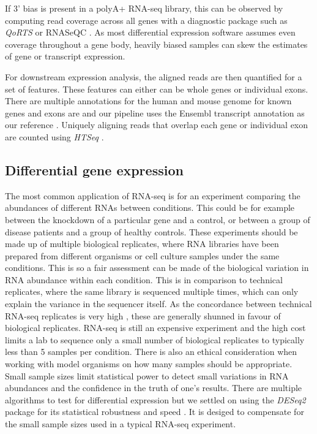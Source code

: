 If 3' bias is present in a polyA+ RNA-seq library, this can be observed by computing read coverage across all genes with a diagnostic package such as \textit{QoRTS} or RNASeQC \citep{Hartley2015a, Deluca2012}. 
As most differential expression software assumes even coverage throughout a gene body, heavily biased samples can skew the estimates of gene or transcript expression.

For downstream expression analysis, the aligned reads are then quantified for a set of features. These features can either can be whole genes or individual exons. 
There are multiple annotations for the human and mouse genome for known genes and exons are and our pipeline uses the Ensembl transcript annotation as our reference \citep{Cunningham2015}. 
Uniquely aligning reads that overlap each gene or individual exon are counted using \textit{HTSeq} \citep{Anders2015-wz}.

\subsection{Differential gene expression}

The most common application of RNA-seq is for an experiment comparing the abundances of different RNAs between conditions.
This could be for example between the knockdown of a particular gene and a control, or between a group of disease patients and a group of healthy controls. 
These experiments should be made up of multiple biological replicates, where RNA libraries have been prepared from different organisms or cell culture samples under the same conditions. 
This is so a fair assessment can be made of the biological variation in RNA abundance within each condition. 
This is in comparison to technical replicates, where the same library is sequenced multiple times, which can only explain the variance  in the sequencer itself. 
As the concordance between technical RNA-seq replicates is very high \citep{Mortazavi2008}, these are generally shunned in favour of biological replicates. 
RNA-seq is still an expensive experiment and the high cost limits a lab to sequence only a small number of biological replicates to typically less than 5 samples per condition. 
There is also an ethical consideration when working with model organisms on how many samples should be appropriate.
Small sample sizes limit statistical power to detect small variations in RNA abundances and the confidence in the truth of one's results. 
There are multiple algorithms to test for differential expression but we settled on using the \textit{DESeq2} package for its statistical robustness and speed \citep{Love2014}. 
It is desiged to compensate for the small sample sizes used in a typical RNA-seq experiment.

